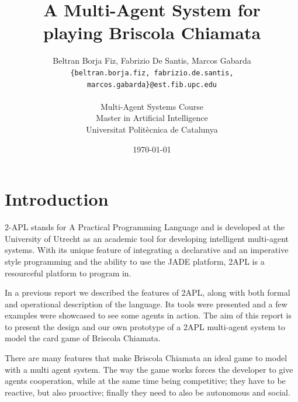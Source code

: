 \documentclass[a4paper]{article}
\begin{document}
\title{A Multi-Agent System for\\ playing Briscola Chiamata}
 
\author{Beltran Borja Fiz, Fabrizio De Santis, Marcos Gabarda\\
\small \texttt{\{beltran.borja.fiz, fabrizio.de.santis, marcos.gabarda\}@est.fib.upc.edu}\\
\\
Multi-Agent Systems Course\\
Master in Artificial Intelligence\\
Universitat Polit\`ecnica de Catalunya}
\date{\today}

\newenvironment{fminipage}%
  {\begin{Sbox}\begin{minipage}}%
  {\end{minipage}\end{Sbox}\fbox{\TheSbox}}

\maketitle

\tableofcontents

\newpage

\section{Introduction}\label{sec:intro}

2-APL stands for A Practical Programming Language and is developed at the University of Utrecht as an academic tool for developing intelligent multi-agent systems. With its unique feature of integrating a declarative and an imperative style programming and the ability to use the JADE platform, 2APL is a resourceful platform to program in.

In a previous report\cite{13559521} we described the features of 2APL, along with both formal and operational description of the language. Its tools were presented and a few examples were showcased to see some agents in action. The aim of this report is to present the design and our own prototype of a 2APL multi-agent system to model the card game of Briscola Chiamata. 

There are many features that make Briscola Chiamata an ideal game to model with a multi agent system. The way the game works forces the developer to give agents cooperation, while at the same time being competitive; they have to be reactive, but also proactive; finally they need to also be autonomous and social.
\end{document}

